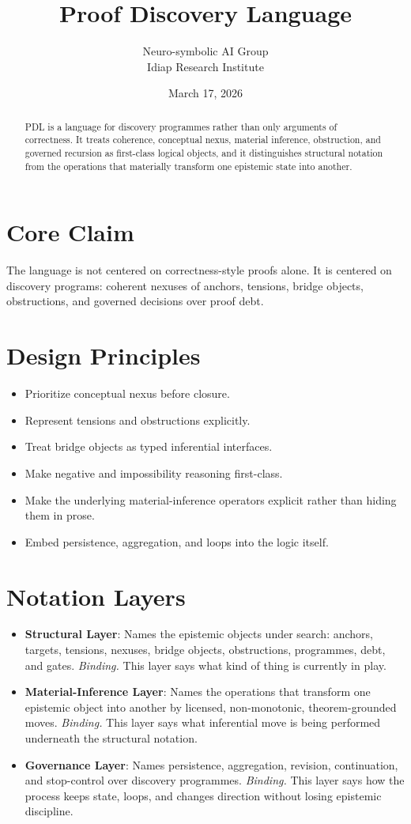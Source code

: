 \documentclass[11pt]{article}
\title{Proof Discovery Language}
\author{Neuro-symbolic AI Group\\Idiap Research Institute}
\date{March 17, 2026}
\begin{document}
\maketitle
\begin{abstract}
PDL is a language for discovery programmes rather than only arguments of correctness. It treats coherence, conceptual nexus, material inference, obstruction, and governed recursion as first-class logical objects, and it distinguishes structural notation from the operations that materially transform one epistemic state into another.
\end{abstract}
\section{Core Claim}
The language is not centered on correctness-style proofs alone. It is centered on discovery programs: coherent nexuses of anchors, tensions, bridge objects, obstructions, and governed decisions over proof debt.
\section{Design Principles}
\begin{itemize}[leftmargin=*,itemsep=0.25em]
\item Prioritize conceptual nexus before closure.
\item Represent tensions and obstructions explicitly.
\item Treat bridge objects as typed inferential interfaces.
\item Make negative and impossibility reasoning first-class.
\item Make the underlying material-inference operators explicit rather than hiding them in prose.
\item Embed persistence, aggregation, and loops into the logic itself.
\end{itemize}
\section{Notation Layers}
\begin{itemize}[leftmargin=*,itemsep=0.25em]
\item \textbf{Structural Layer}: Names the epistemic objects under search: anchors, targets, tensions, nexuses, bridge objects, obstructions, programmes, debt, and gates. \emph{Binding.} This layer says what kind of thing is currently in play.
\item \textbf{Material-Inference Layer}: Names the operations that transform one epistemic object into another by licensed, non-monotonic, theorem-grounded moves. \emph{Binding.} This layer says what inferential move is being performed underneath the structural notation.
\item \textbf{Governance Layer}: Names persistence, aggregation, revision, continuation, and stop-control over discovery programmes. \emph{Binding.} This layer says how the process keeps state, loops, and changes direction without losing epistemic discipline.
\end{itemize}
\end{document}
